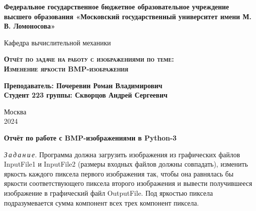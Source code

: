 \documentclass{article}
\begin{document}
\begin{titlepage}
\newpage

\begin{center}
      \textbf{Федеральное государственное бюджетное образовательное учреждение высшего образования «Московский государственный университет имени М. В. Ломоносова»}\\
    \end{center}

\vspace{8em}

\begin{center}
\Large Кафедра вычислительной механики \\ 
\end{center}

\vspace{2em}

\begin{center}
\Large \textsc{\textbf{Отчёт по задаче на работу с изображениями по теме:}}
\\
\Large \textsc{\textbf{ Изменение яркости BMP-изображения \linebreak}}
\end{center}

\vspace{15em}



\begin{flushright}
      \small
      \textbf{Преподаватель: Почеревин Роман Владимирович}\\
      \textbf{Студент 223 группы: Скворцов Андрей Сергеевич}\\
    \end{flushright}


\vspace{\fill}

\begin{center}
Москва \\2024
\end{center}

\end{titlepage}

\begin{center}


{\large\bf Отчёт по работе с BMP-изображениями в Python-3}
\end{center}
\textit{З\,а\,д\,а\,н\,и\,е.} Программа должна загрузить изображения из графических файлов
InputFile1 и InputFile2 (размеры входных файлов должны совпадать),
изменить яркость каждого пиксела первого изображения так, чтобы она
равнялась бы яркости соответствующего пиксела второго изображения
и вывести получившееся изображение в графический файл OutputFile.
Под яркостью пиксела подразумевается сумма компонент всех трех компонент пиксела.
\end{document}
